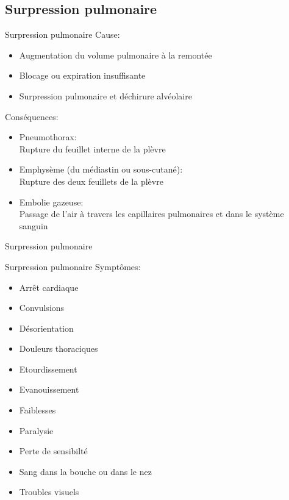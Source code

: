 \subsection{Surpression pulmonaire}

\begin{frame}{Surpression pulmonaire}
	Cause:
	\begin{itemize}
		\item Augmentation du volume pulmonaire à la remontée
		\item Blocage ou expiration insuffisante
		\item Surpression pulmonaire et déchirure alvéolaire
	\end{itemize}
	\vfill
	Conséquences:
	\begin{itemize}
		\item Pneumothorax:\\Rupture du feuillet interne de la plèvre
		\item Emphysème (du médiastin ou sous-cutané):\\Rupture des deux feuillets de la plèvre
		\item Embolie gazeuse:\\Passage de l'air à travers les capillaires pulmonaires et dans le système sanguin
	\end{itemize}
\end{frame}
	
\begin{frame}{Surpression pulmonaire}
\end{frame}

\begin{frame}{Surpression pulmonaire}  
	Symptômes:
	\begin{multicols}{2}
		\begin{itemize}
			\item Arrêt cardiaque
			\item Convulsions
			\item Désorientation
			\item Douleurs thoraciques
			\item Etourdissement
			\item Evanouissement
			\item Faiblesses
			\item Paralysie
			\item Perte de sensibilté
			\item Sang dans la bouche ou dans le nez
			\item Troubles visuels
		\end{itemize}
	\end{multicols}
\end{frame}

